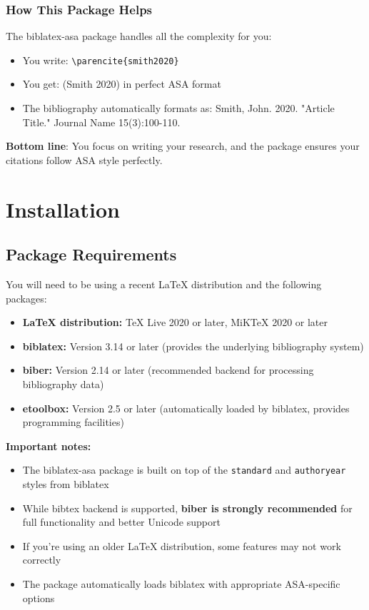 \documentclass[11pt,a4paper]{ltxdoc}
\begin{document}
\subsubsection{How This Package Helps}

The \textsf{biblatex-asa} package handles all the complexity for you:
\begin{itemize}
  \item You write: \texttt{\textbackslash parencite\{smith2020\}}
  \item You get: (Smith 2020) in perfect ASA format
  \item The bibliography automatically formats as: Smith, John. 2020. "Article Title." Journal Name 15(3):100-110.
\end{itemize}

\textbf{Bottom line}: You focus on writing your research, and the package ensures your citations follow ASA style perfectly.

\section{Installation}

\subsection{Package Requirements}

You will need to be using a recent LaTeX distribution and the following packages:

\begin{itemize}
  \item \textbf{LaTeX distribution:} TeX Live 2020 or later, MiKTeX 2020 or later
  \item \textbf{biblatex:} Version 3.14 or later (provides the underlying bibliography system)
  \item \textbf{biber:} Version 2.14 or later (recommended backend for processing bibliography data)
  \item \textbf{etoolbox:} Version 2.5 or later (automatically loaded by biblatex, provides programming facilities)
\end{itemize}

\textbf{Important notes:}
\begin{itemize}
  \item The \textsf{biblatex-asa} package is built on top of the \texttt{standard} and \texttt{authoryear} styles from biblatex
  \item While bibtex backend is supported, \textbf{biber is strongly recommended} for full functionality and better Unicode support
  \item If you're using an older LaTeX distribution, some features may not work correctly
  \item The package automatically loads biblatex with appropriate ASA-specific options
\end{itemize}
\end{document}
